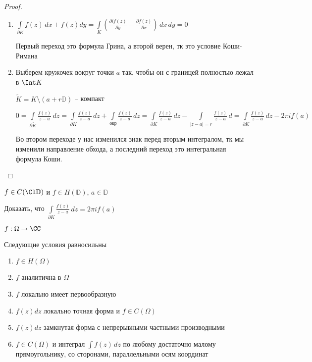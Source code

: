 \begin{proof}\thmslashn
		
	\begin{enumerate}
		\item 
		$\int\limits_{\partial K} f(z)\,dx + f(z)dy = \int\limits_{K}\left( \frac{\partial if(z)}{\partial y} - \frac{\partial f(z)}{\partial x} \right)\,dx\,dy = 0$
		
		Первый переход это формула Грина, а второй верен, тк это условие Коши-Римана 
		
		\item
		Выберем кружочек вокруг точки $a$ так, чтобы он с границей полностью лежал в $\Int K$
		
		$\tilde{K} = K \setminus(a + r\mathbb{D})$ -- компакт
		
		$0 = \int\limits_{\partial \tilde{K}} \frac{f(z)}{z-a}\,dz = \int\limits_{\partial K} \frac{f(z)}{z-a}\,dz + \int\limits_{\text{окр}} \frac{f(z)}{z-a}\,dz =  \int\limits_{\partial K} \frac{f(z)}{z-a}\,dz - \int\limits_{|z-a| = r} \frac{f(z)}{z-a}\,d = \int\limits_{\partial K} \frac{f(z)}{z-a}\,dz - 2\pi i f(a)$
		
		Во втором переходе у нас изменился знак перед вторым интегралом, тк мы изменили направление обхода, а последний переход это интегральная формула Коши.
	\end{enumerate}
	
\end{proof}

\begin{exerc}
	$f\in C(\Cl \mathbb{D})$ и $f \in H(\mathbb{D})$, $a \in \mathbb{D}$
	
	Доказать, что $\int\limits_{\partial K} \frac{f(z)}{z-a}\,dz = 2\pi i f(a)$
\end{exerc}

\begin{theorem}\thmslashn
	
	$f:\Omega \to \CC$ 
	
	Следующие условия равносильны
	
	\begin{enumerate}[1)]
		\item 
		$f\in H(\Omega)$
		\item
		$f$ аналитична в $\Omega$
		\item
		$f$ локально имеет первообразную
		\item
		$f(z)dz$ локально точная форма и $f \in C(\Omega)$
		\item
		$f(z)dz$ замкнутая форма с непрерывными частными производными 
		\item
		$f\in C(\Omega)$ и интеграл $\int f(z)\,dz$ по любому достаточно малому прямоугольнику, со сторонами, параллельными осям координат
		 
	\end{enumerate}
	
\end{theorem}

